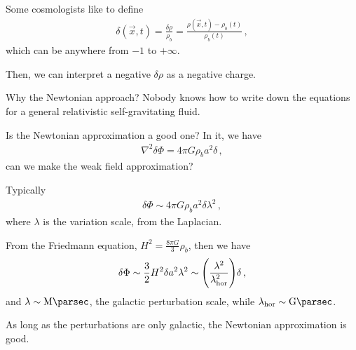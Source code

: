 \documentclass[main.tex]{subfiles}
\begin{document}
Some cosmologists like to define 
%
\begin{align}
  \delta (\vec{x}, t) = \frac{ \delta \rho}{\rho _b} = \frac{\rho (\vec{x}, t) - \rho _b (t)}{\rho _b (t)}
\,,
\end{align}
%
which can be anywhere from \(-1\) to \(+ \infty \). 

Then, we can interpret a negative \(\delta \rho \) as a negative charge. 

Why the Newtonian approach? Nobody knows how to write down the equations for a general relativistic self-gravitating fluid. 

Is the Newtonian approximation a good one? In it, we have 
%
\begin{align}
  \nabla^2 \delta \Phi  = 4 \pi G \rho _b a^2 \delta 
\,,
\end{align}
%
can we make the weak field approximation? 

Typically 
%
\begin{align}
  \delta \Phi \sim 4 \pi G \rho _b a^2 \delta \lambda^2
\,,
\end{align}
%
where \(\lambda \) is the variation scale, from the Laplacian. 

From the Friedmann equation, \(H^2=  \frac{8 \pi G}{3} \rho_b\), then we have 
%
\begin{align}
  \delta \Phi \sim \frac{3}{2} H^2 \delta a^2 \lambda^2 \sim  \qty(\frac{\lambda^2  }{\lambda _{\text{hor}}^2}) \delta 
\,,
\end{align}
%
and \(\lambda \sim \SI{}{\mega\parsec}\), the galactic perturbation scale, while \(\lambda _{\text{hor}} \sim \SI{}{\giga\parsec}\). 

As long as the perturbations are only galactic, the Newtonian approximation is good. 
\end{document}
